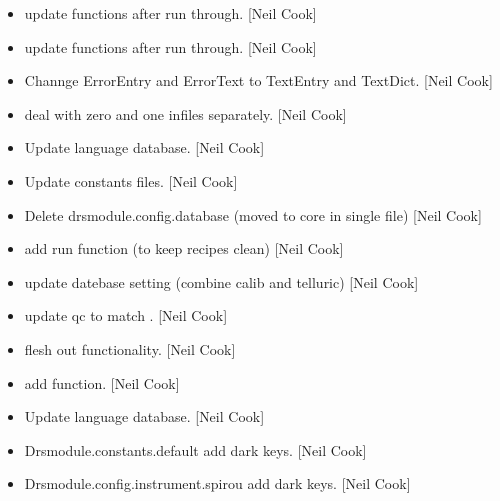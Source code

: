 \documentclass[a4paper,10pt,english]{report}
\begin{document}
\begin{itemize}
\item {} 
 \sphinxhyphen{} update functions after run through. {[}Neil Cook{]}

\item {} 
 \sphinxhyphen{} update functions after run through. {[}Neil Cook{]}

\item {} 
Channge ErrorEntry and ErrorText to TextEntry and TextDict. {[}Neil
Cook{]}

\item {} 
 \sphinxhyphen{} deal with zero and one infiles separately. {[}Neil Cook{]}

\item {} 
Update language database. {[}Neil Cook{]}

\item {} 
Update constants files. {[}Neil Cook{]}

\item {} 
Delete drsmodule.config.database (moved to core in single  file)
{[}Neil Cook{]}

\item {} 
 \sphinxhyphen{} add run function (to keep recipes clean) {[}Neil Cook{]}

\item {} 
 \sphinxhyphen{} update datebase setting (combine calib and telluric)
{[}Neil Cook{]}

\item {} 
 \sphinxhyphen{} update qc to match . {[}Neil Cook{]}

\item {} 
 \sphinxhyphen{} flesh out functionality. {[}Neil Cook{]}

\item {} 
 \sphinxhyphen{} add  function.
{[}Neil Cook{]}

\item {} 
Update language database. {[}Neil Cook{]}

\item {} 
Drsmodule.constants.default \sphinxhyphen{} add dark keys. {[}Neil Cook{]}

\item {} 
Drsmodule.config.instrument.spirou \sphinxhyphen{} add dark keys. {[}Neil Cook{]}


\end{itemize}
\end{document}
